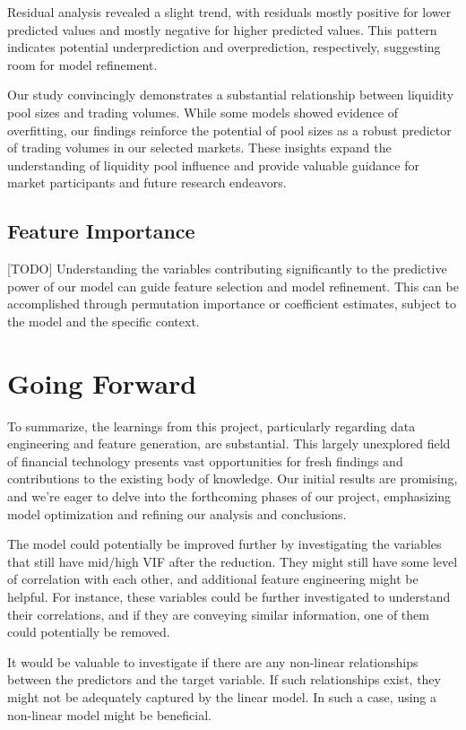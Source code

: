 \documentclass{article}
\begin{document}
Residual analysis revealed a slight trend, with residuals mostly positive for lower predicted values and mostly negative for higher predicted values. This pattern indicates potential underprediction and overprediction, respectively, suggesting room for model refinement.

Our study convincingly demonstrates a substantial relationship between liquidity pool sizes and trading volumes. While some models showed evidence of overfitting, our findings reinforce the potential of pool sizes as a robust predictor of trading volumes in our selected markets. These insights expand the understanding of liquidity pool influence and provide valuable guidance for market participants and future research endeavors.



\subsection{Feature Importance}
[TODO] Understanding the variables contributing significantly to the predictive power of our model can guide feature selection and model refinement. This can be accomplished through permutation importance or coefficient estimates, subject to the model and the specific context.

\section{Going Forward}

To summarize, the learnings from this project, particularly regarding data engineering and feature generation, are substantial. This largely unexplored field of financial technology presents vast opportunities for fresh findings and contributions to the existing body of knowledge. Our initial results are promising, and we're eager to delve into the forthcoming phases of our project, emphasizing model optimization and refining our analysis and conclusions.

The model could potentially be improved further by investigating the variables that still have mid/high VIF after the reduction. They might still have some level of correlation with each other, and additional feature engineering might be helpful. For instance, these variables could be further investigated to understand their correlations, and if they are conveying similar information, one of them could potentially be removed.

It would be valuable to investigate if there are any non-linear relationships between the predictors and the target variable. If such relationships exist, they might not be adequately captured by the linear model. In such a case, using a non-linear model might be beneficial.
\end{document}
